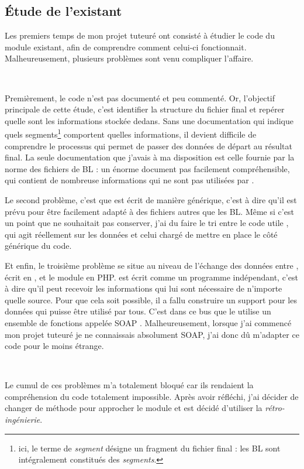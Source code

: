 \subsection{Étude de l'existant}
Les premiers temps de mon projet tuteuré ont consisté à étudier le code du module existant, afin de comprendre comment celui-ci fonctionnait. Malheureusement, plusieurs problèmes sont venu compliquer l'affaire.

~

Premièrement, le code n'est pas documenté et peu commenté. Or, l'objectif principale de cette étude, c'est identifier la structure du fichier final et repérer quelle sont les informations stockée dedans. Sans une documentation qui indique quels segments\footnote{ici, le terme de \emph{segment} désigne un fragment du fichier final : les BL sont intégralement constitués des \emph{segments}.} comportent quelles informations, il devient difficile de comprendre le processus qui permet de passer des données de départ au résultat final. La seule documentation que j'avais à ma disposition est celle fournie par la norme des fichiers de BL : un énorme document pas facilement compréhensible, qui contient de nombreuse informations qui ne sont pas utilisées par \pireus.

Le second problème, c'est que \pireus{} est écrit de manière générique, c'est à dire qu'il est prévu pour être facilement adapté à des fichiers autres que les BL. Même si c'est un point que \solulog{} ne souhaitait pas conserver, j'ai du faire le tri entre le code \og utile \fg, qui agit réellement sur les données et celui chargé de mettre en place le côté générique du code.

Et enfin, le troisième problème se situe au niveau de l'échange des données entre \integrale, écrit en \vb, et le module en PHP. \pireus{} est écrit comme un programme indépendant, c'est à dire qu'il peut recevoir les informations qui lui sont nécessaire de n'importe quelle source. Pour que cela soit possible, il a fallu construire un support pour les données qui puisse être utilisé par tous. C'est dans ce bus que le \pireus{} utilise un ensemble de fonctions appelée \og SOAP \fg. Malheureusement, lorsque j'ai commencé mon projet tuteuré je ne connaissais absolument SOAP, j'ai donc dû m'adapter ce code pour le moins étrange.

~

Le cumul de ces problèmes m'a totalement bloqué car ils rendaient la compréhension du code totalement impossible. Après avoir réfléchi, j'ai décider de changer de méthode pour approcher le module et est décidé d'utiliser la \emph{rétro-ingénierie}.

